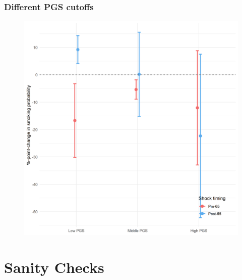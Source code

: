 \documentclass[10pt,compress,xcolor=dvipsnames,aspectratio=169]{beamer}    %
\newcounter{ex}
\newcommand{\1}[1]{\mathrm{1\hspace*{-2.5pt}l}[#1]}	%
\begin{document}
\begin{frame}
\frametitle{Different PGS cutoffs}

\begin{figure}[hbtp]
\centering
\includegraphics[height=0.8\textheight]{../../3_output/shock_effects/robustness_6070__3pgs_cvplot.png}
\label{fig:3pgs}
\end{figure}

\end{frame}

\section{Sanity Checks}
\end{document}
